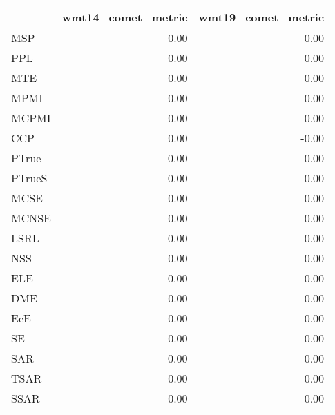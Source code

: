 \begin{tabular}{lrr}
\toprule
 & wmt14\_comet\_metric & wmt19\_comet\_metric \\
\midrule
MSP & 0.00 & 0.00 \\
PPL & 0.00 & 0.00 \\
MTE & 0.00 & 0.00 \\
MPMI & 0.00 & 0.00 \\
MCPMI & 0.00 & 0.00 \\
CCP & 0.00 & -0.00 \\
PTrue & -0.00 & -0.00 \\
PTrueS & -0.00 & -0.00 \\
MCSE & 0.00 & 0.00 \\
MCNSE & 0.00 & 0.00 \\
LSRL & -0.00 & -0.00 \\
NSS & 0.00 & 0.00 \\
ELE & -0.00 & -0.00 \\
DME & 0.00 & 0.00 \\
EcE & 0.00 & -0.00 \\
SE & 0.00 & 0.00 \\
SAR & -0.00 & 0.00 \\
TSAR & 0.00 & 0.00 \\
SSAR & 0.00 & 0.00 \\
\bottomrule
\end{tabular}
